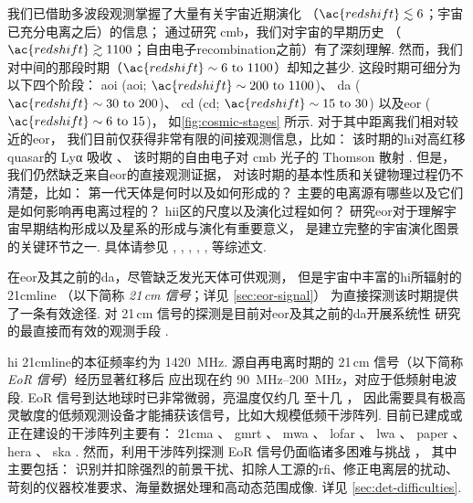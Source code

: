 我们已借助多波段观测掌握了大量有关宇宙近期演化
（$\ac{redshift} \lesssim 6$；宇宙已充分电离之后）的信息；
通过研究 \ac{cmb}，我们对宇宙的早期历史
（$\ac{redshift} \gtrsim 1100$；自由电子\ac{recombination}之前）有了深刻理解.
然而，我们对中间的那段时期（$\ac{redshift} \sim \numrange{6}{1100}$）却知之甚少.
这段时期可细分为以下四个阶段\cite{koopmans2015}：
\acs{aoi} (\acl{aoi}; $\ac{redshift} \sim \numrange{200}{1100}$)、
\acs{da} ($\ac{redshift} \sim \numrange{30}{200}$)、
\acs{cd} (\acl{cd}; $\ac{redshift} \sim \numrange{15}{30}$)
以及\acl{eor} ($\ac{redshift} \sim \numrange{6}{15}$)，
如\autoref{fig:cosmic-stages} 所示.
对于其中距离我们相对较近的\acl{eor}，
我们目前仅获得非常有限的间接观测信息，比如：
该时期的\ac{hi}对高红移\ac{quasar}的 Lyα 吸收 \cite{becker2001}、
该时期的自由电子对 \ac{cmb} 光子的 Thomson 散射 \cite{kaplinghat2003}.
但是，我们仍然缺乏来自\acl{eor}的直接观测证据，
对该时期的基本性质和关键物理过程仍不清楚，比如：
第一代天体是何时以及如何形成的？
主要的电离源有哪些以及它们是如何影响再电离过程的？
\ac{hii}区的尺度以及演化过程如何？
研究\acl{eor}对于理解宇宙早期结构形成以及星系的形成与演化有重要意义，
是建立完整的宇宙演化图景的关键环节之一.
具体请参见 , ,
, ,
,  等综述文.

在\acl{eor}及其之前的\ac{da}，尽管缺乏发光天体可供观测，
但是宇宙中丰富的\ac{hi}所辐射的 \ac{21cmline}
（以下简称 \emph{21\,cm 信号}；详见 \autoref{sec:eor-signal}）
为直接探测该时期提供了一条有效途径.
对 21\,cm 信号的探测是目前对\acl{eor}及其之前的\ac{da}开展系统性
研究的最直接而有效的观测手段
\cite{madau1997,tozzi2000,furlanetto2006,koopmans2015,furlanetto2016}.

\ac{hi} \ac{21cmline}的本征频率约为 \SI{1420}{\MHz}.
源自再电离时期的 21\,cm 信号（以下简称 \emph{EoR 信号}）经历显著红移后
应出现在约 \SIrange{90}{200}{\MHz}，对应于低频射电波段.
EoR 信号到达地球时已非常微弱，亮温度仅约几 \si{\mK} 至十几 \si{\mK}，
因此需要具有极高灵敏度的低频观测设备才能捕获该信号，比如大规模低频干涉阵列.
目前已建成或正在建设的干涉阵列主要有：
\ac{21cma} \cite{zheng2016}、
\ac{gmrt} \cite{paciga2011}、
\ac{mwa} \cite{bowman2013,tingay2013}、
\ac{lofar} \cite{vanHaarlem2013}、
\ac{lwa} \cite{ellingson2009}、
\ac{paper} \cite{parsons2010}、
\ac{hera} \cite{deBoer2017}、
\ac{ska} \cite{mellema2013,koopmans2015}.
然而，利用干涉阵列探测 EoR 信号仍面临诸多困难与挑战
\cite{morales2010,wijnholds2010}，
其中主要包括：
识别并扣除强烈的前景干扰、扣除人工源的\ac{rfi}、修正电离层的扰动、
苛刻的仪器校准要求、海量数据处理和高动态范围成像.
详见 \autoref{sec:det-difficulties}.

